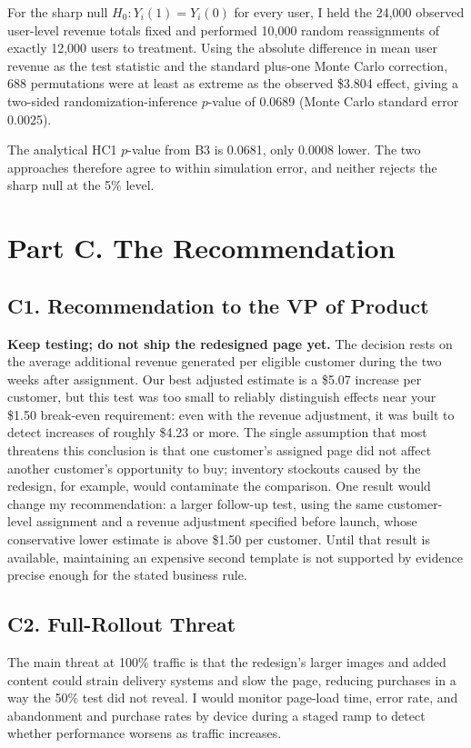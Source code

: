 \documentclass[11pt]{article}
\begin{document}
For the sharp null $H_0:Y_i(1)=Y_i(0)$ for every user, I held the 24,000
observed user-level revenue totals fixed and performed 10,000 random
reassignments of exactly 12,000 users to treatment. Using the absolute
difference in mean user revenue as the test statistic and the standard
plus-one Monte Carlo correction, 688 permutations were at least as extreme as
the observed \$3.804 effect, giving a two-sided randomization-inference
$p$-value of 0.0689 (Monte Carlo standard error 0.0025).

The analytical HC1 $p$-value from B3 is 0.0681, only 0.0008 lower. The two
approaches therefore agree to within simulation error, and neither rejects
the sharp null at the 5\% level.

\section*{Part C. The Recommendation}
\subsection*{C1. Recommendation to the VP of Product}

\noindent
\textbf{Keep testing; do not ship the redesigned page yet.} The decision rests
on the average additional revenue generated per eligible customer during the
two weeks after assignment. Our best adjusted estimate is a \$5.07 increase
per customer, but this test was too small to reliably distinguish effects near
your \$1.50 break-even requirement: even with the revenue adjustment, it was
built to detect increases of roughly \$4.23 or more. The single assumption
that most threatens this conclusion is that one customer's assigned page did
not affect another customer's opportunity to buy; inventory stockouts caused
by the redesign, for example, would contaminate the comparison. One result
would change my recommendation: a larger follow-up test, using the same
customer-level assignment and a revenue adjustment specified before launch,
whose conservative lower estimate is above \$1.50 per customer. Until that
result is available, maintaining an expensive second template is not supported
by evidence precise enough for the stated business rule.

\subsection*{C2. Full-Rollout Threat}

The main threat at 100\% traffic is that the redesign's larger images and added
content could strain delivery systems and slow the page, reducing purchases in
a way the 50\% test did not reveal. I would monitor page-load time, error rate,
and abandonment and purchase rates by device during a staged ramp to detect
whether performance worsens as traffic increases.
\end{document}
